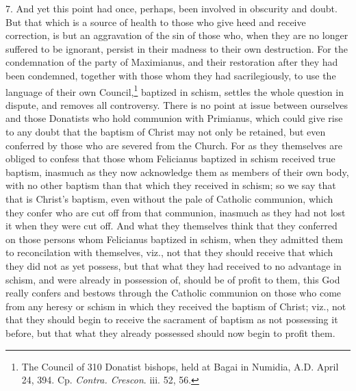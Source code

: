 7. And yet this point had once, perhaps, been involved in obscurity and doubt. But that which is a source of health to those who give heed and receive correction, is but an aggravation of the sin of those who, when they are no longer suffered to be ignorant, persist in their madness to their own destruction. For the condemnation of the party of Maximianus, and their restoration after they had been condemned, together with those whom they had sacrilegiously, to use the language of their own Council,\footnote{\par  The Council of 310 Donatist bishops, held at Bagai in Numidia, A.D. April 24, 394. Cp. \emph{Contra. Crescon}. iii. 52, 56.} baptized in schism, settles the whole question in dispute, and removes all controversy. There is no point at issue between ourselves and those Donatists who hold communion with Primianus, which could give rise to any doubt that the baptism of Christ may not only be retained, but even conferred by those who are severed from the Church. For as they themselves are obliged to confess that those whom Felicianus baptized in schism received true baptism, inasmuch as they now acknowledge them as members of their own body, with no other baptism than that which they received in schism; so we say that that is Christ’s baptism, even without the pale of Catholic communion, which they confer who are cut off from that communion, inasmuch as they had not lost it when they were cut off. And what they themselves think that they conferred on those persons whom Felicianus baptized in schism, when they admitted them to reconcilation with themselves, viz., not that they should receive that which they did not as yet possess, but that what they had received to no advantage in schism, and were already in possession of, should be of profit to them, this God really confers and bestows through the Catholic communion on those who come from any heresy or schism in which they received the baptism of Christ; viz., not that they should begin to receive the sacrament of baptism as not possessing it before, but that what they already possessed should now begin to profit them.


